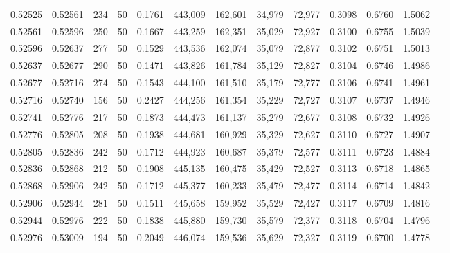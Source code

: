 \begin{tabular}{rrrrrrrrrrrrr}
0.52525 & 0.52561 &   234 &  50 &                                     0.1761 & 443,009 & 162,601 &  34,979 &  72,977 & 0.3098 & 0.6760 & 1.5062 \\
0.52561 & 0.52596 &   250 &  50 &                                     0.1667 & 443,259 & 162,351 &  35,029 &  72,927 & 0.3100 & 0.6755 & 1.5039 \\
0.52596 & 0.52637 &   277 &  50 &                                     0.1529 & 443,536 & 162,074 &  35,079 &  72,877 & 0.3102 & 0.6751 & 1.5013 \\
0.52637 & 0.52677 &   290 &  50 &                                     0.1471 & 443,826 & 161,784 &  35,129 &  72,827 & 0.3104 & 0.6746 & 1.4986 \\
0.52677 & 0.52716 &   274 &  50 &                                     0.1543 & 444,100 & 161,510 &  35,179 &  72,777 & 0.3106 & 0.6741 & 1.4961 \\
0.52716 & 0.52740 &   156 &  50 &                                     0.2427 & 444,256 & 161,354 &  35,229 &  72,727 & 0.3107 & 0.6737 & 1.4946 \\
0.52741 & 0.52776 &   217 &  50 &                                     0.1873 & 444,473 & 161,137 &  35,279 &  72,677 & 0.3108 & 0.6732 & 1.4926 \\
0.52776 & 0.52805 &   208 &  50 &                                     0.1938 & 444,681 & 160,929 &  35,329 &  72,627 & 0.3110 & 0.6727 & 1.4907 \\
0.52805 & 0.52836 &   242 &  50 &                                     0.1712 & 444,923 & 160,687 &  35,379 &  72,577 & 0.3111 & 0.6723 & 1.4884 \\
0.52836 & 0.52868 &   212 &  50 &                                     0.1908 & 445,135 & 160,475 &  35,429 &  72,527 & 0.3113 & 0.6718 & 1.4865 \\
0.52868 & 0.52906 &   242 &  50 &                                     0.1712 & 445,377 & 160,233 &  35,479 &  72,477 & 0.3114 & 0.6714 & 1.4842 \\
0.52906 & 0.52944 &   281 &  50 &                                     0.1511 & 445,658 & 159,952 &  35,529 &  72,427 & 0.3117 & 0.6709 & 1.4816 \\
0.52944 & 0.52976 &   222 &  50 &                                     0.1838 & 445,880 & 159,730 &  35,579 &  72,377 & 0.3118 & 0.6704 & 1.4796 \\
0.52976 & 0.53009 &   194 &  50 &                                     0.2049 & 446,074 & 159,536 &  35,629 &  72,327 & 0.3119 & 0.6700 & 1.4778 \\

\end{tabular}
